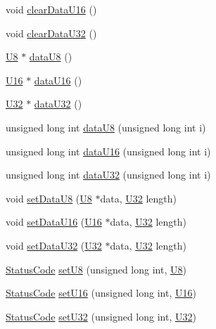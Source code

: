 \begin{DoxyCompactItemize}
\item 
void \hyperlink{classIOdata_a13016f489aba6e80cd7be53224c3e8ab}{clearDataU16} ()
\item 
void \hyperlink{classIOdata_a848de1b6e7b7207dbb53c102a4d911a9}{clearDataU32} ()
\item 
\hyperlink{classIOdata_a18d1354b7cdaf0f8a8001fdbb3ced418}{U8} $\ast$ \hyperlink{classIOdata_a75e9c318dbac3a39402179070943d4bc}{dataU8} ()
\item 
\hyperlink{classIOdata_a1eb45b348534a7c19a4a99b746e693ff}{U16} $\ast$ \hyperlink{classIOdata_a8d8528b731c6cf117f8c5b9b2473390c}{dataU16} ()
\item 
\hyperlink{classIOdata_a96fb57f5fcd87b708743abd3c86a5198}{U32} $\ast$ \hyperlink{classIOdata_ab0e3cd09f46c1c3712f797116f6da074}{dataU32} ()
\item 
unsigned long int \hyperlink{classIOdata_a9c7cc68c435e1b22dcdac7c17d186e63}{dataU8} (unsigned long int i)
\item 
unsigned long int \hyperlink{classIOdata_a32e3bb958cb6babcb928d403fea9f171}{dataU16} (unsigned long int i)
\item 
unsigned long int \hyperlink{classIOdata_a4ce3bcd54206b1a2149e67cb45dee922}{dataU32} (unsigned long int i)
\item 
void \hyperlink{classIOdata_afece89b7035f6eec001cd397f07c062d}{setDataU8} (\hyperlink{classIOdata_a18d1354b7cdaf0f8a8001fdbb3ced418}{U8} $\ast$data, \hyperlink{classIOdata_a96fb57f5fcd87b708743abd3c86a5198}{U32} length)
\item 
void \hyperlink{classIOdata_a1796a65cbd8c4326e80d662034ee5e39}{setDataU16} (\hyperlink{classIOdata_a1eb45b348534a7c19a4a99b746e693ff}{U16} $\ast$data, \hyperlink{classIOdata_a96fb57f5fcd87b708743abd3c86a5198}{U32} length)
\item 
void \hyperlink{classIOdata_a408b62ac645630c645ae670691f6459f}{setDataU32} (\hyperlink{classIOdata_a96fb57f5fcd87b708743abd3c86a5198}{U32} $\ast$data, \hyperlink{classIOdata_a96fb57f5fcd87b708743abd3c86a5198}{U32} length)
\item 
\hyperlink{classStatusCode}{StatusCode} \hyperlink{classIOdata_a6c4fb2f2af01889ada889c2b7aceb24d}{setU8} (unsigned long int, \hyperlink{classIOdata_a18d1354b7cdaf0f8a8001fdbb3ced418}{U8})
\item 
\hyperlink{classStatusCode}{StatusCode} \hyperlink{classIOdata_aa9ade5ce3944c8e2b831533b6f876caf}{setU16} (unsigned long int, \hyperlink{classIOdata_a1eb45b348534a7c19a4a99b746e693ff}{U16})
\item 
\hyperlink{classStatusCode}{StatusCode} \hyperlink{classIOdata_abbed9a057203bc763f97b85fb385f36b}{setU32} (unsigned long int, \hyperlink{classIOdata_a96fb57f5fcd87b708743abd3c86a5198}{U32})

\end{DoxyCompactItemize}
